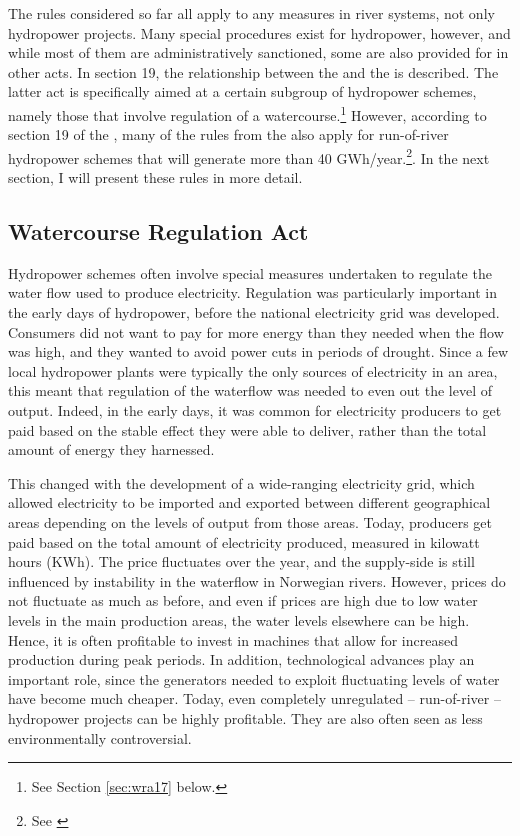 The rules considered so far all apply to any measures in river systems, not only hydropower projects. Many special procedures exist for hydropower, however, and while most of them are administratively sanctioned, some are also provided for in other acts. In section 19, the relationship between the \cite{wra00} and the \cite{wra00} is described. The latter act is specifically aimed at a certain subgroup of hydropower schemes, namely those that involve regulation of a watercourse.\footnote{See Section \ref{sec:wra17} below.} However, according to section 19 of the \cite{wra00}, many of the rules from the \cite{wra17} also apply for run-of-river hydropower schemes that will generate more than 40 GWh/year.\footnote{See \cite[19]{wra00}}. In the next section, I will present these rules in more detail.

\subsection{Watercourse Regulation Act}\label{ssec:wra17}

Hydropower schemes often involve special measures undertaken to regulate the water flow used to produce electricity. Regulation was particularly important in the early days of hydropower, before the national electricity grid was developed. Consumers did not want to pay for more energy than they needed when the flow was high, and they wanted to avoid power cuts in periods of drought. Since a few local hydropower plants were typically the only sources of electricity in an area, this meant that regulation of the waterflow was needed to even out the level of output. Indeed, in the early days, it was common for electricity producers to get paid based on the stable effect they were able to deliver, rather than the total amount of energy they harnessed.

This changed with the development of a wide-ranging electricity grid, which allowed electricity to be imported and exported between different geographical areas depending on the levels of output from those areas. Today, producers get paid based on the total amount of electricity produced, measured in kilowatt hours (KWh). The price fluctuates over the year, and the supply-side is still influenced by instability in the waterflow in Norwegian rivers. However, prices do not fluctuate as much as before, and even if prices are high due to low water levels in the main production areas, the water levels elsewhere can be high. Hence, it is often profitable to invest in machines that allow for increased production during peak periods. In addition, technological advances play an important role, since the generators needed to exploit fluctuating levels of water have become much cheaper. Today, even completely unregulated -- run-of-river -- hydropower projects can be highly profitable. They are also often seen as less environmentally controversial.

